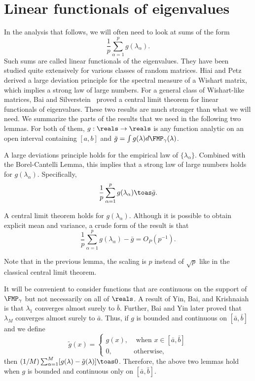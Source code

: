 \section{Linear functionals of eigenvalues}

In the analysis that follows, we will often need to look at sums of the form
\[
    \frac{1}{p} \sum_{\alpha=1}^p g (\lambda_\alpha).
\]
Such sums are called linear functionals of the eigenvalues.  They have been
studied quite extensively for various classes of random matrices.  Hiai and Petz~\cite{hiai1998edw} derived a large deviation principle for the spectral measure  of a Wishart matrix, which implies a strong law of large numbers.  For a  general class of Wishart-like matrices, Bai and Silverstein~\cite{bai2004clt} proved a central limit theorem for linear functionals of eigenvalues.  These two results are much stronger than what we will need.  We summarize the parts of the results that we need in the following two lemmas. For both of them, $g: \reals \to \reals$ is any function analytic on an open interval containing $[a,b]$  and $\bar g = \int g(\lambda) d\FMP_\gamma (\lambda)$.

\begin{lemma}\label{L:wishart-lln}
    A large deviations principle holds for the empirical law of 
    $\{ \lambda_\alpha \}$.  Combined with the Borel-Cantelli Lemma, this
    implies that a strong law of large numbers holds for $g(\lambda_\alpha)$. 
    Specifically,
    \[
        \frac{1}{p} \sum_{\alpha=1}^p g( \lambda_\alpha ) \toas \bar g.
    \]
\end{lemma}
    
\begin{lemma}\label{L:wishart-clt}
    A central limit theorem holds for $g(\lambda_\alpha)$.  Although it is
    possible to obtain explicit mean and variance, a crude form of the
    result is that
    \[
        \frac{1}{p} 
        \sum_{\alpha=1}^p
            g( \lambda_\alpha ) - \bar g 
        = O_P(p^{-1}).
    \]  
\end{lemma}

Note that in the previous lemma, the scaling is $p$ instead of $\sqrt{p}$ like in the classical central limit theorem.

It will be convenient to consider functions that are continuous on the support
of $\FMP_\gamma$ but not necessarily on all of $\reals$.  A result of Yin, Bai, and
Krishnaiah \cite{yin1988lle} is that $\lambda_1$ converges almost surely to
$\bar b$.  Further, Bai and Yin \cite{bai1993lse} later proved that
$\lambda_M$ converges almost surely to $\bar a$.  Thus, if $g$ is 
bounded and continuous on $[\bar a, \bar b]$ and we define 
\[
    \tilde g (x)
    =
    \begin{cases}
        g(x), &\text{ when $x \in [\bar a, \bar b]$} \\
        0,    &\text{otherwise,}
    \end{cases}
\]
then $(1/M) \sum_{\alpha=1}^M [ g(\lambda) - \tilde g (\lambda)] \toas 0$.  
Therefore, the above two lemmas hold when $g$ is bounded and continuous only
on $[\bar a, \bar b]$.

